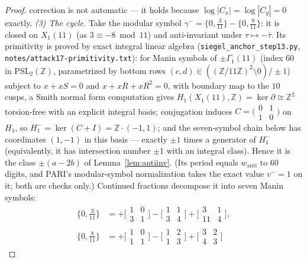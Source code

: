 \documentclass[preprint,12pt]{elsarticle}
\theoremstyle{definition}
\theoremstyle{remark}
\newcommand{\Z}{\mathbb{Z}}
\begin{document}
\begin{proof}
correction is not automatic --- it holds because
$\log|C_x|=\log|C_y|=0$ exactly.
\emph{(3) The cycle.}  Take the modular symbol
$\gamma^-=\{0,\tfrac{3}{11}\}-\{0,\tfrac{8}{11}\}$: it is closed on
$X_1(11)$ (as $3\equiv-8\bmod 11$) and anti-invariant under
$\tau\mapsto-\bar\tau$.  Its primitivity is proved by exact integral
linear algebra (\texttt{siegel\_anchor\_step13.py},
\texttt{notes/attack17-primitivity.txt}): for Manin symbols of
$\pm\Gamma_1(11)$ (index $60$ in $\mathrm{PSL}_2(\Z)$, parametrized by
bottom rows $(c,d)\in((\Z/11\Z)^2\setminus0)/\pm1$) subject to $x+xS=0$
and $x+xR+xR^2=0$, with boundary map to the $10$ cusps, a Smith normal
form computation gives $H_1(X_1(11),\Z)=\ker\partial\cong\Z^2$
torsion-free with an explicit integral basis; conjugation induces
$C=\bigl(\begin{smallmatrix}0&1\\1&0\end{smallmatrix}\bigr)$ on $H_1$,
so $H_1^-=\ker(C+I)=\Z\cdot(-1,1)$; and the seven-symbol chain below
has coordinates $(1,-1)$ in this basis --- exactly $\pm1$ times a
generator of $H_1^-$ (equivalently, it has intersection number $\pm1$
with an integral class).  Hence it is the class $\pm(a-2b)$ of
Lemma~\ref{lem:antiinv}.  (Its period equals $w_{\mathrm{anti}}$ to $60$
digits, and PARI's modular-symbol normalization takes the exact value
$v^-=1$ on it; both are checks only.)  Continued fractions decompose it
into seven Manin symbols:
\[
\begin{aligned}
  \{0,\tfrac{3}{11}\}&=\textstyle
   +\bigl[\begin{smallmatrix}1&0\\3&1\end{smallmatrix}\bigr]
   -\bigl[\begin{smallmatrix}1&1\\3&4\end{smallmatrix}\bigr]
   +\bigl[\begin{smallmatrix}3&1\\11&4\end{smallmatrix}\bigr],\\
  \{0,\tfrac{8}{11}\}&=\textstyle
   +\bigl[\begin{smallmatrix}1&0\\1&1\end{smallmatrix}\bigr]
   -\bigl[\begin{smallmatrix}1&2\\1&3\end{smallmatrix}\bigr]
   +\bigl[\begin{smallmatrix}3&2\\4&3\end{smallmatrix}\bigr]

\end{aligned}\]
\end{proof}
\end{document}
